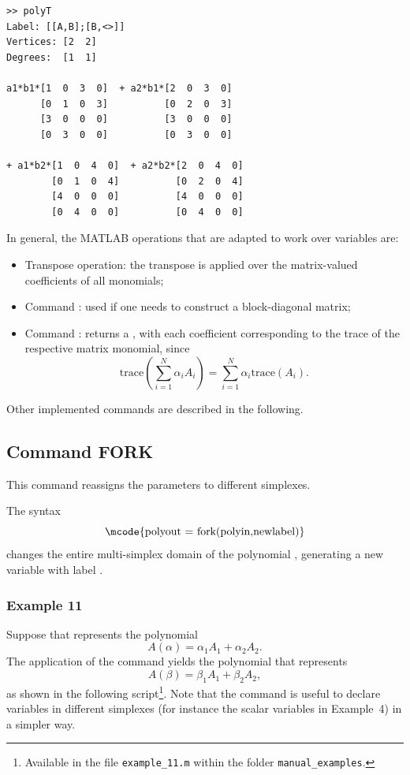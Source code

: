 \documentclass[english,11pt]{article}
\theoremstyle{break} \theorembodyfont{\small\rm}
\begin{document}
\begin{minipage}{10.5cm}
\begin{lstlisting}[rulecolor=\color{red}]
>> polyT
Label: [[A,B];[B,<>]]
Vertices: [2  2]
Degrees:  [1  1]

a1*b1*[1  0  3  0]  + a2*b1*[2  0  3  0]
      [0  1  0  3]          [0  2  0  3]
      [3  0  0  0]          [3  0  0  0]
      [0  3  0  0]          [0  3  0  0]

+ a1*b2*[1  0  4  0]  + a2*b2*[2  0  4  0]
        [0  1  0  4]          [0  2  0  4]
        [4  0  0  0]          [4  0  0  0]
        [0  4  0  0]          [0  4  0  0]

\end{lstlisting}
\end{minipage}



In general, the MATLAB operations that are adapted to work over  variables are:

\begin{itemize}
 \item Transpose operation: the transpose is applied over the matrix-valued coefficients of all monomials;

 \item Command : used if one needs to construct a  block-diagonal matrix;

 \item Command : returns a , with each coefficient corresponding to the trace of
 the respective matrix monomial, since
 \[
 \displaystyle \mbox{trace}\left(\sum_{i=1}^N \alpha_i A_i\right) = \sum_{i=1}^N \alpha_i \mbox{trace}(A_i).
 \]
\end{itemize}

Other implemented commands are described in the following.

\subsection*{Command FORK}

This command reassigns the parameters to different simplexes.

The syntax
\[
\mbox{\mcode{polyout = fork(polyin,newlabel)}}
\]
changes the entire multi-simplex domain of the polynomial , generating a
new variable with label .

\subsubsection*{Example 11}
Suppose that  represents the polynomial
\[
 A(\alpha) = \alpha_1 A_1 + \alpha_2 A_2.
\]
The application of the command  yields the polynomial 
that represents
\[
 A(\beta) = \beta_1 A_1 + \beta_2 A_2,
\]
as shown in the following script\footnote{Available in the file \texttt{example\_11.m} within the folder \texttt{manual\_examples}.}. Note
that the  command is useful to declare variables in different simplexes (for instance the scalar variables in Example~4)
in a simpler way.
\end{document}
